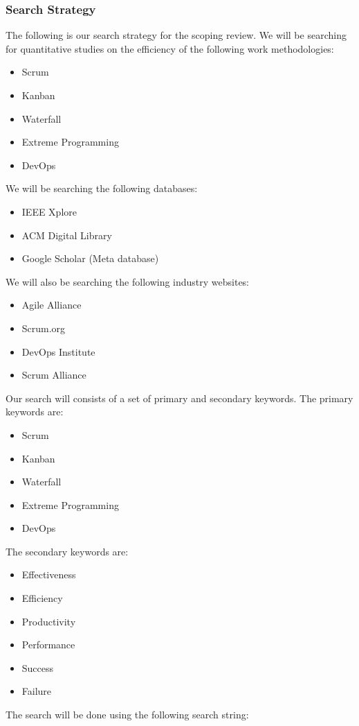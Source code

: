 \documentclass[12pt]{article}
\begin{document}
\subsubsection{Search Strategy}
The following is our search strategy for the scoping review.
We will be searching for quantitative studies on the efficiency of the following work methodologies:
\begin{itemize}
  \item Scrum
  \item Kanban
  \item Waterfall
  \item Extreme Programming
  \item DevOps
\end{itemize}
We will be searching the following databases:
\begin{itemize}
  \item IEEE Xplore \cite{IEEEXplore}
  \item ACM Digital Library \cite{ACMDigitalLibrary}
  \item Google Scholar \cite{GoogleScholar} (Meta database)
\end{itemize}
We will also be searching the following industry websites:
\begin{itemize}
  \item Agile Alliance \cite{AgileAlliance2015}
  \item Scrum.org \cite{HomeScrumorg}
  \item DevOps Institute \cite{Organisations}
  \item Scrum Alliance \cite{ScrumAllianceFind}
\end{itemize}
Our search will consists of a set of primary and secondary keywords.
The primary keywords are:
\begin{itemize}
  \item Scrum
  \item Kanban
  \item Waterfall
  \item Extreme Programming
  \item DevOps
\end{itemize}
The secondary keywords are:
\begin{itemize}
  \item Effectiveness
  \item Efficiency
  \item Productivity
  \item Performance
  \item Success
  \item Failure
\end{itemize}
The search will be done using the following search string:
\end{document}
